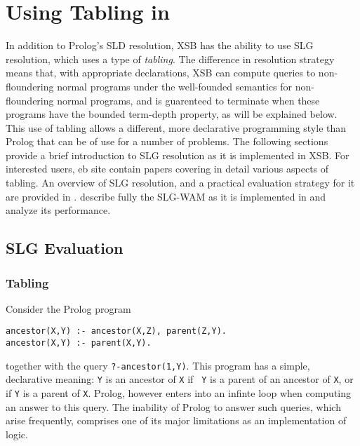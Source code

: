 \chapter{Using Tabling in \ourprolog} \label{tabling_overview}
In addition to Prolog's SLD resolution, XSB has the ability to use SLG
resolution, which uses a type of {\em tabling}.  The difference in
resolution strategy means that, with appropriate declarations, XSB can
compute queries to non-floundering normal programs under the
well-founded semantics \cite{VGRS91} for non-floundering normal
programs, and is guarenteed to terminate when these programs have the
bounded term-depth property, as will be explained below.  This use of
tabling allows a different, more declarative programming style than
Prolog that can be of use for a number of problems.  The following
sections provide a brief introduction to SLG resolution as it is
implemented in XSB.  For interested users, eb site contain papers
covering in detail various aspects of tabling.  An overview of SLG
resolution, and a practical evaluation strategy for it are provided in
\cite{ChWa96,SaSW95a,FSW98}. \cite{SaSw98,RRSSW98,JFLP-Scheduling,ChSW95}
describe fully the SLG-WAM as it is implemented in \version and
analyze its performance.

\section{SLG Evaluation}

\subsection{Tabling}	
Consider the Prolog program
\begin{center}
\begin{minipage}{3.8in}
\begin{verbatim}
ancestor(X,Y) :- ancestor(X,Z), parent(Z,Y).
ancestor(X,Y) :- parent(X,Y).
\end{verbatim}						       
\end{minipage}
\end{center}
together with the query {\tt ?-ancestor(1,Y)}.  This program has a
simple, declarative meaning: {\tt Y} is an ancestor of {\tt X} if {\tt
Y} is a parent of an ancestor of {\tt X}, or if {\tt Y} is a parent of
{\tt X}.  Prolog, however enters into an infinte loop when
computing an answer to this query.  The inability of Prolog to answer
such queries, which arise frequently, comprises one of its major
limitations as an implementation of logic.

